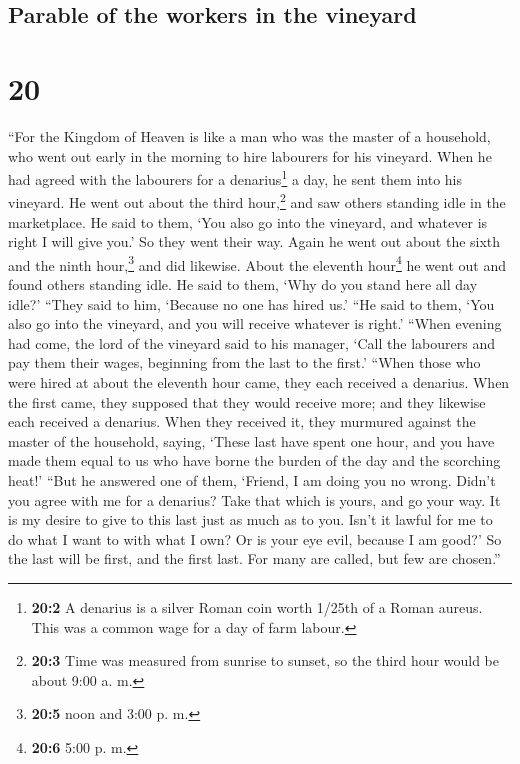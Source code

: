 \hypertarget{parable-of-the-workers-in-the-vineyard}{%
\subsection{Parable of the workers in the
vineyard}\label{parable-of-the-workers-in-the-vineyard}}

\hypertarget{section-19}{%
\section{20}\label{section-19}}

 ``For the Kingdom of Heaven is like a man who was the
master of a household, who went out early in the morning to hire
labourers for his vineyard.  When he had agreed with the
labourers for a denarius\footnote{\textbf{20:2} A denarius is a silver
  Roman coin worth 1/25th of a Roman aureus. This was a common wage for
  a day of farm labour.} a day, he sent them into his vineyard.
 He went out about the third hour,\footnote{\textbf{20:3}
  Time was measured from sunrise to sunset, so the third hour would be
  about 9:00 a. m.} and saw others standing idle in the marketplace.
 He said to them, `You also go into the vineyard, and
whatever is right I will give you.' So they went their way.
 Again he went out about the sixth and the ninth
hour,\footnote{\textbf{20:5} noon and 3:00 p. m.} and did likewise.
 About the eleventh hour\footnote{\textbf{20:6} 5:00 p. m.}
he went out and found others standing idle. He said to them, `Why do you
stand here all day idle?'  ``They said to him, `Because no
one has hired us.' ``He said to them, `You also go into the vineyard,
and you will receive whatever is right.'  ``When evening
had come, the lord of the vineyard said to his manager, `Call the
labourers and pay them their wages, beginning from the last to the
first.'  ``When those who were hired at about the eleventh
hour came, they each received a denarius.  When the first
came, they supposed that they would receive more; and they likewise each
received a denarius.  When they received it, they
murmured against the master of the household,  saying,
`These last have spent one hour, and you have made them equal to us who
have borne the burden of the day and the scorching heat!'
 ``But he answered one of them, `Friend, I am doing you
no wrong. Didn't you agree with me for a denarius?  Take
that which is yours, and go your way. It is my desire to give to this
last just as much as to you.  Isn't it lawful for me to
do what I want to with what I own? Or is your eye evil, because I am
good?'  So the last will be first, and the first last.
For many are called, but few are chosen.''

